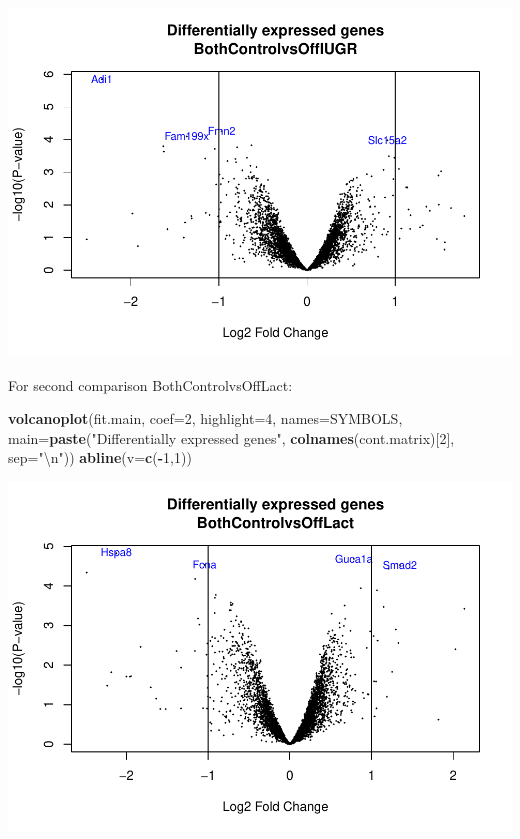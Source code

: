 \documentclass[]{article}
\newenvironment{Shaded}{\begin{snugshade}}{\end{snugshade}}
\newcommand{\KeywordTok}[1]{\textcolor[rgb]{0.13,0.29,0.53}{\textbf{#1}}}
\newcommand{\DataTypeTok}[1]{\textcolor[rgb]{0.13,0.29,0.53}{#1}}
\newcommand{\DecValTok}[1]{\textcolor[rgb]{0.00,0.00,0.81}{#1}}
\newcommand{\CharTok}[1]{\textcolor[rgb]{0.31,0.60,0.02}{#1}}
\newcommand{\StringTok}[1]{\textcolor[rgb]{0.31,0.60,0.02}{#1}}
\newcommand{\OperatorTok}[1]{\textcolor[rgb]{0.81,0.36,0.00}{\textbf{#1}}}
\newcommand{\NormalTok}[1]{#1}
\begin{document}
\includegraphics{delVal_AnaIsabel_ADO_PEC1_files/figure-latex/unnamed-chunk-43-1.pdf}

For second comparison BothControlvsOffLact:

\begin{Shaded}
\begin{Highlighting}[]
\KeywordTok{volcanoplot}\NormalTok{(fit.main, }\DataTypeTok{coef=}\DecValTok{2}\NormalTok{, }\DataTypeTok{highlight=}\DecValTok{4}\NormalTok{, }\DataTypeTok{names=}\NormalTok{SYMBOLS, }
\DataTypeTok{main=}\KeywordTok{paste}\NormalTok{(}\StringTok{"Differentially expressed genes"}\NormalTok{, }\KeywordTok{colnames}\NormalTok{(cont.matrix)[}\DecValTok{2}\NormalTok{], }\DataTypeTok{sep=}\StringTok{"}\CharTok{\textbackslash{}n}\StringTok{"}\NormalTok{))}
\KeywordTok{abline}\NormalTok{(}\DataTypeTok{v=}\KeywordTok{c}\NormalTok{(}\OperatorTok{-}\DecValTok{1}\NormalTok{,}\DecValTok{1}\NormalTok{))}
\end{Highlighting}
\end{Shaded}

\includegraphics{delVal_AnaIsabel_ADO_PEC1_files/figure-latex/unnamed-chunk-45-1.pdf}
\end{document}
